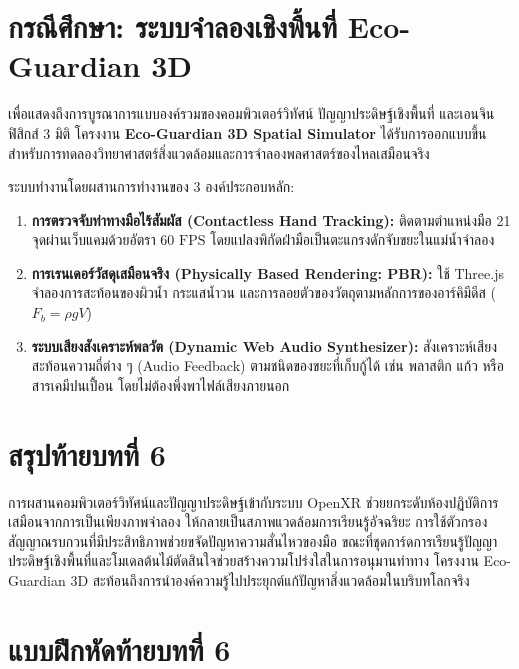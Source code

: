 \section{กรณีศึกษา: ระบบจำลองเชิงพื้นที่ Eco-Guardian 3D}

เพื่อแสดงถึงการบูรณาการแบบองค์รวมของคอมพิวเตอร์วิทัศน์ ปัญญาประดิษฐ์เชิงพื้นที่ และเอนจินฟิสิกส์ 3 มิติ โครงงาน \textbf{Eco-Guardian 3D Spatial Simulator} ได้รับการออกแบบขึ้นสำหรับการทดลองวิทยาศาสตร์สิ่งแวดล้อมและการจำลองพลศาสตร์ของไหลเสมือนจริง

ระบบทำงานโดยผสานการทำงานของ 3 องค์ประกอบหลัก:
\begin{enumerate}
    \item \textbf{การตรวจจับท่าทางมือไร้สัมผัส (Contactless Hand Tracking):} ติดตามตำแหน่งมือ 21 จุดผ่านเว็บแคมด้วยอัตรา $60\text{ FPS}$ โดยแปลงพิกัดฝ่ามือเป็นตะแกรงดักจับขยะในแม่น้ำจำลอง
    \item \textbf{การเรนเดอร์วัสดุเสมือนจริง (Physically Based Rendering: PBR):} ใช้ Three.js จำลองการสะท้อนของผิวน้ำ กระแสน้ำวน และการลอยตัวของวัตถุตามหลักการของอาร์คิมีดีส ($F_b = \rho g V$)
    \item \textbf{ระบบเสียงสังเคราะห์พลวัต (Dynamic Web Audio Synthesizer):} สังเคราะห์เสียงสะท้อนความถี่ต่าง ๆ (Audio Feedback) ตามชนิดของขยะที่เก็บกู้ได้ เช่น พลาสติก แก้ว หรือสารเคมีปนเปื้อน โดยไม่ต้องพึ่งพาไฟล์เสียงภายนอก
\end{enumerate}

\clearpage

\section*{สรุปท้ายบทที่ 6}

การผสานคอมพิวเตอร์วิทัศน์และปัญญาประดิษฐ์เข้ากับระบบ OpenXR ช่วยยกระดับห้องปฏิบัติการเสมือนจากการเป็นเพียงภาพจำลอง ให้กลายเป็นสภาพแวดล้อมการเรียนรู้อัจฉริยะ การใช้ตัวกรองสัญญาณรบกวนที่มีประสิทธิภาพช่วยขจัดปัญหาความสั่นไหวของมือ ขณะที่ชุดการ์ดการเรียนรู้ปัญญาประดิษฐ์เชิงพื้นที่และโมเดลต้นไม้ตัดสินใจช่วยสร้างความโปร่งใสในการอนุมานท่าทาง โครงงาน Eco-Guardian 3D สะท้อนถึงการนำองค์ความรู้ไปประยุกต์แก้ปัญหาสิ่งแวดล้อมในบริบทโลกจริง

\clearpage

\section*{แบบฝึกหัดท้ายบทที่ 6}

